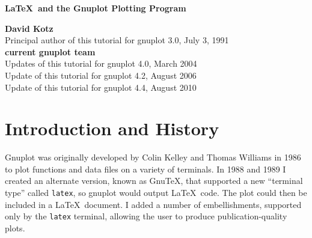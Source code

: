 %
%
%
%
%







\begin{titlepage}

\begin{center}
{\Large \bf \LaTeX\ and the Gnuplot Plotting Program}

\vskip2cm

{\bf David Kotz} \\[0.4cm]
Principal author of this tutorial for gnuplot 3.0, July 3, 1991 \\[1.0cm]

{\bf current gnuplot team} \\[0.4cm]
Updates of this tutorial for gnuplot 4.0, March 2004 \\
Update of this tutorial for gnuplot 4.2, August 2006 \\
Update of this tutorial for gnuplot 4.4, August 2010

\vskip2cm


\end{center}

\vfil
\vfil
\tableofcontents
\vfil

\end{titlepage}


\pagestyle{myheadings}

\currentspace %

\section{Introduction and History}

Gnuplot was originally developed by Colin Kelley and Thomas Williams
in 1986 to plot functions and data files on a variety of terminals.
In 1988 and 1989 I created an alternate version, known as Gnu\TeX,
that supported a new ``terminal type'' called {\tt latex}, so gnuplot
would output \LaTeX\ code. The plot could then be included in a
\LaTeX\ document. I added a number of embellishments, supported only
by the {\tt latex} terminal, allowing the user to produce
publication-quality plots.

